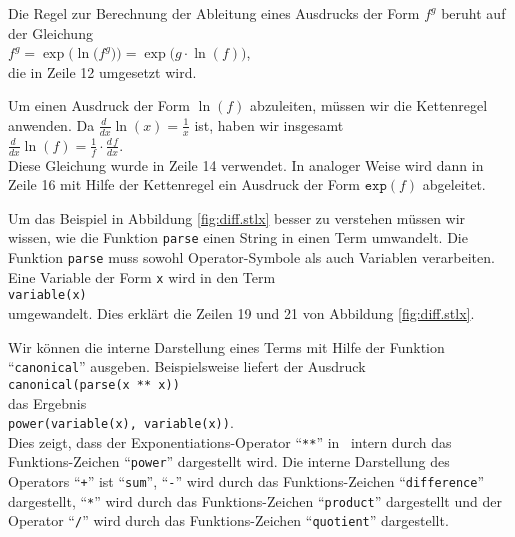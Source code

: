 Die Regel zur Berechnung der  Ableitung eines Ausdrucks der Form $f^g$ beruht auf der
Gleichung
\\[0.2cm]
\hspace*{1.3cm}
$f^g = \exp\bigl(\ln\bigl(f^g\bigr)\bigr) = \exp\bigl(g \cdot \ln(f)\bigr)$,
\\[0.2cm]
die in Zeile 12 umgesetzt wird.  

Um einen Ausdruck der Form $\ln(f)$ abzuleiten, müssen
wir die Kettenregel anwenden.  Da $\frac{d\;}{dx} \ln(x) = \frac{1}{x}$ ist, haben wir insgesamt
\\[0.2cm]
\hspace*{1.3cm}
$\displaystyle \frac{d\;}{dx} \ln(f) = \frac{1}{f} \cdot \frac{d\,f}{dx}$.
\\[0.2cm]
Diese Gleichung wurde in Zeile 14 verwendet.  In analoger Weise wird dann in Zeile 16 mit Hilfe der
Kettenregel ein Ausdruck der Form $\mathtt{exp}(f)$ abgeleitet.

Um das Beispiel in Abbildung \ref{fig:diff.stlx} besser zu verstehen müssen wir wissen, 
wie die Funktion \texttt{parse} einen String in einen Term umwandelt.  Die Funktion 
 \texttt{parse} muss sowohl Operator-Symbole als auch Variablen verarbeiten.
Eine Variable der Form  \texttt{x} wird in den Term
\\[0.2cm]
\hspace*{1.3cm}
\texttt{variable(x)}
\\[0.2cm]
umgewandelt.  Dies erklärt die Zeilen 19 und 21 von Abbildung \ref{fig:diff.stlx}.

Wir können die interne Darstellung eines Terms mit Hilfe der Funktion
``\texttt{canonical}'' ausgeben.  Beispielsweise liefert der Ausdruck
\\[0.2cm]
\hspace*{1.3cm}
\texttt{canonical(parse(x ** x))}
\\[0.2cm]
das Ergebnis
\\[0.2cm]
\hspace*{1.3cm}
\texttt{power(variable(x), variable(x))}.
\\[0.2cm]
Dies zeigt, dass der Exponentiations-Operator ``\texttt{**}'' in \setl\ intern durch das Funktions-Zeichen
``\texttt{power}'' dargestellt wird.  Die interne Darstellung des Operators
``\texttt{+}'' ist ``\texttt{sum}'',
``\texttt{-}'' wird durch das Funktions-Zeichen ``\texttt{difference}'' dargestellt,
``\texttt{*}'' wird durch das Funktions-Zeichen ``\texttt{product}'' dargestellt und der Operator
``\texttt{/}'' wird durch das Funktions-Zeichen ``\texttt{quotient}'' dargestellt.

